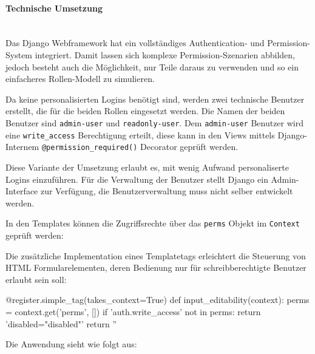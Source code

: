 \paragraph{Technische Umsetzung} \hspace{0pt} \\
Das Django Webframework hat ein vollständiges Authentication- und
Permission-System integriert. Damit lassen sich komplexe Permission-Szenarien
abbilden, jedoch besteht auch die Möglichkeit, nur Teile daraus zu verwenden und
so ein einfacheres Rollen-Modell zu simulieren.

Da keine personalisierten Logins benötigt sind, werden zwei technische Benutzer
erstellt, die für die beiden Rollen eingesetzt werden. Die Namen der beiden Benutzer sind 
 \texttt{admin-user} und \texttt{readonly-user}. Dem
\texttt{admin-user} Benutzer wird eine \texttt{write\_access} Berechtigung erteilt, diese
kann in den Views mittels Django-Internem \texttt{@permission\_required()}
Decorator geprüft werden.

Diese Variante der Umsetzung erlaubt es, mit wenig Aufwand personaliserte Logins
einzuführen. Für die Verwaltung der Benutzer stellt Django ein Admin-Interface
zur Verfügung, die Benutzerverwaltung muss nicht selber entwickelt werden.

In den Templates können die Zugriffsrechte über das \texttt{perms} Objekt im
\texttt{Context} geprüft werden:


Die zusätzliche Implementation eines Templatetags erleichtert die Steuerung von
HTML Formularelementen, deren Bedienung nur für schreibberechtigte Benutzer
erlaubt sein soll:

\begin{pythoncode}
@register.simple_tag(takes_context=True)
def input_editability(context):
    perms = context.get('perms', [])
    if 'auth.write_access' not in perms:
        return 'disabled="disabled"'
    return ''
\end{pythoncode}

Die Anwendung sieht wie folgt aus:


